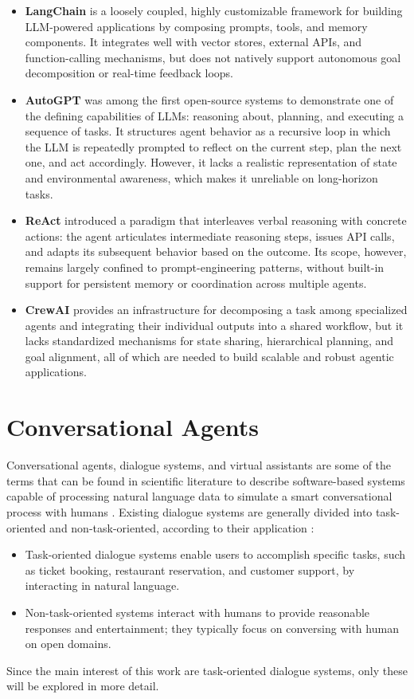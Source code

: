 \documentclass[12pt,a4paper,openright,twoside]{book}
\begin{document}
\begin{itemize}
    \item \textbf{LangChain} is a loosely coupled, highly customizable framework for building LLM-powered applications
    by composing prompts, tools, and memory components. It integrates well with vector stores, external APIs, and function-calling mechanisms,
    but does not natively support autonomous goal decomposition or real-time feedback loops. %
    \item \textbf{AutoGPT} was among the first open-source systems to demonstrate one of the defining capabilities of LLMs:
    reasoning about, planning, and executing a sequence of tasks. It structures agent behavior as a recursive loop in which
    the LLM is repeatedly prompted to reflect on the current step, plan the next one, and act accordingly.
    However, it lacks a realistic representation of state and environmental awareness, which makes it unreliable on long-horizon tasks.
    \item \textbf{ReAct} introduced a paradigm that interleaves verbal reasoning with concrete actions: the agent articulates
    intermediate reasoning steps, issues API calls, and adapts its subsequent behavior based on the outcome. Its scope, however, remains largely confined
    to prompt-engineering patterns, without built-in support for persistent memory or coordination across multiple agents.
    \item \textbf{CrewAI} provides an infrastructure for decomposing a task among specialized agents and integrating their individual outputs into
    a shared workflow, but it lacks standardized mechanisms for state sharing, hierarchical planning, and goal alignment,
    all of which are needed to build scalable and robust agentic applications.
\end{itemize}

\section{Conversational Agents}
\label{sec:conversational-agents}

Conversational agents, dialogue systems, and virtual assistants are some of the terms that can be found
in scientific literature to describe software-based systems capable of processing
natural language data to simulate a smart conversational process with humans \cite{motger2022software, balaraman2021recent}.
Existing dialogue systems are generally divided into task-oriented and non-task-oriented, according to their application \cite{chen2017survey}:
\begin{itemize}
    \item Task-oriented dialogue systems enable users to accomplish specific tasks,
    such as ticket booking, restaurant reservation, and customer support, by interacting in natural language.
    \item Non-task-oriented systems interact with humans to provide reasonable responses and entertainment;
    they typically focus on conversing with human on open domains.
\end{itemize}
Since the main interest of this work are task-oriented dialogue systems, only these will be explored in more detail.
\end{document}
